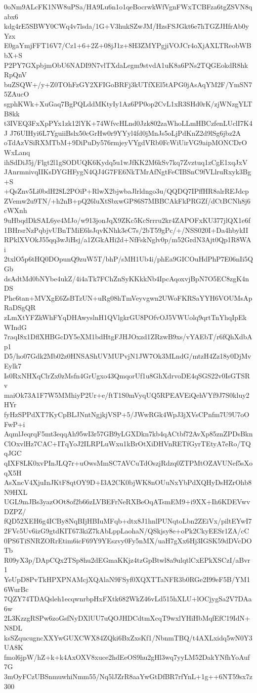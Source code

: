 0oNm9ALcFK1NW8uPSa/HA9Lu6n1o1qeBocrwkWfVgnFWxTCBFza6tgZSVN8qabx6
kdg4rE5SBWY0CWq4v7lsda/1G+V3hukSZwJM/HzsFSJGkt6e7hTGZJHfrAb0yYzx
E0gaYmjFFT16V7/Cz1+6+2Z+08jJ1z+8H3ZMYPgjiVOJCr4oXjAXLTReobWBbX+S
P2PY7GXpbjmObU6NADI9N7vlTXdaLegm9stvdA1uK8a6PNs2TQGEokdR8hkRpQnV
buZSQW+/y+Z0TOhFzGY2XFIGoBRFj3kUTfXEl5tAPG0jAsAqYM2F/YmSN75ZAucO
sgphKWk+XuGaq7BgPQLddMKtyIy1Az6PP0op2CvL1xR3SHd0rK/zjWNzgYLTB8kk
t3IVEQ3FxXpPYx1zk12lYK+74WfvcHLnd0Jzk802zaWhoLLmHBCzfenLUclI7K4J
J76UIHyi6L7YguiiBslx50cGrHw0r9YYyl4fd0jMnJs5oLjPdKnZ2d9lSg6jbz2A
oTdAzVSiRXMTbM+9DiPuDy576rmjeyVYgdVRb0FcWiUirVG9aipMONCDrOWxLanq
ihSdDiJ5j/Flgt2l1gSODUQK6Kydq5u1wJfKK2M6kSv7kq7Zvztuq1zCgE1xqJxV
JAnrmnivqIIKsDYGHFygN4QJ4G7FE6NkTMrAfNgtFeCIBSnC9fVLlruRxyk3Bg+S
+QsZnv5Li0bdH28L2POiP+RlwX2bjwbaJlrldngo3u/QQDQ7IPffHR8alrREJdcp
ZVemw2u9TN/+h2nB+pQ26luXtSbxwGP86S7MBBCAkFkPRGZf/dCtBCNh8j6cWXnh
9uHbqdDkSAL6ye4MJo/w913jonJqX9ZKc5KcSrrru2kr4ZAPOFxKU377jlQX1e6f
1BHrsrNzPqbjvUBnTMiE6lsJqvKNhk3eC7s/2bT59gPc/+/NSS020I+Da4hbykII
RPklXVOkJ55qq3wJiHsj/a1ZGkAHi2d+NfFskNglv0p/m52GrdN3Ajt0Qp1R8WAi
2txlO5p6tHQ0DOpunQ9zuW5T/bhP/sMH1Ub4i/phEa9GICOuHdPhP7E06nIi5QGb
dsAdtMd0bNYbe4ukZ/4i4aTk7FChZnSyKKkkNb4IpcAqoxvjBpN7O5EC8zgK4nDS
Phc6tan+MVXgE6ZsBTzUN+uRg08hTmVeyvgwn2UWoFKRSaYYH6VOUMsApRaDSgQR
zLmXtYFZkWhFYqDHAwyslnH1QVlgkrGU8POfvOJ5VWUolq9qrtTnYhqIpEkWIndG
7raqI8x1DflXHBGcDY5eXM1bdHtgFJHJOxzd1ZRzwB9xs/vYAEbT/r6fQhXdbAp1
D5/ho07Gdk2Mb02z0HNSAShUVMUPvjN1JW7Ok3MLndG/mtzH4Zz18y0DjMvEylk7
Is0RxNHXqClrZx0zMsfn4GrUgxo43QmqorUf1u8GhXdrvoDE4qSGS22v0IsGTSRv
maiOk73A1F7W5MMhiyP2Ur+e/ftT1S0mVyqUQ5RPEAVEiQehVYf9J7S0kluy2HYr
fyHzSPPdXT7KyCpBLJNntNgjkjVSP+5/JWwRGk4WpJ3jXVsCPnfm7U9U7oOFwP+i
AqmlJeqrqF5mt3eqqAh95wI3r57GB9yLGXDkn7kb4qACtbf72AvXp85znZPDsBkn
ClOxvlHz7CAC+ITqYoJ2ILRPLuWxu1kBrOtXiDHVnRETfGyrTEtyA7eRo/TQqJGC
qIXF8LK0xvPInJLQ7r+uOwsMmSC7AVCuTdOszjRdzq0ZTPMtOZAVUNef5sXoqX5H
AsXncV4XjuInJKtF8qtOY9D+I3A2CK0bjWK8nOUuNxYbPdXQHyDsHZrOhb8N9HXL
UGL9mJBs3yazOOt8of2b66zLVBEFrNeRXBeOqATsmEM9+i9XX+Ih6KDEVwvDZPZ/
fQD52XEH6g4ICBy8NqBIjHBIuMFqb+dtx8J1hnlPUNqtoLbn2ZEiVx/piltEYwI7
2FVc5Uv6izG9gtdKIT673kiZ7kAbLppLaohaN/QSkjsy8e+oPk2CkyEESr1ZA/cC
0PS6TiSNRZORrEtim6icF69Y9YEszvy0Fy5nMX/uaH7gXx6Hj3IGSK59dDVcDOTb
R09yX3p/DApCQx2TSp8hu2dEGmaKKjz4tzGpBtwl8a9ulqtlCxEPkXSCzI/aBvr1
YeUpD8PvTkHPXPNAMcjXQAlaN9FSyf0XQXTTaNFR3b0RGe2I99eF5B/YM16WurBc
7QZY74TDAQsleh1ecqwnrbpHxFXtk682WkZ46vLd515hXLU+lOCjygSa2V7DAa6w
2L3KzzgRSPw6zoGsfNyDXlUU7uQOJHDCdtmXcqT9wxlYHiHbMqfEfC19IdN+N8DL
ksSZqucugncXXYwGUXCWX84ZQki6BxZxsKf1/NbnmTBQ/t4AXLxidq5wN0Y3UA8K
fmol6jpW/hZ+k+k4AxOXV8xuce2hdEeOS9hu2gHl3wq7yyLM52DakYNfhYoAuf7G
3mOyFCzUBSnmuwhiNmm55/Nq5lJZrR8aaYwGtDfBR7rfYnL+1g++6NT59sx7z300

